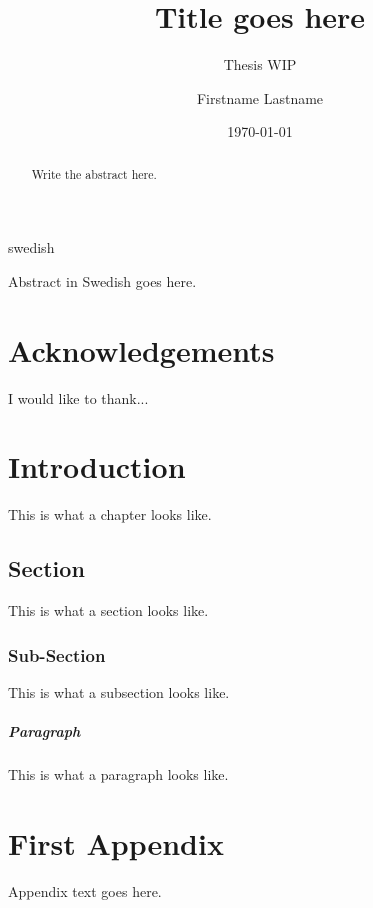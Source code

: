 \documentclass[a4paper,11pt]{kth-mag}
\title{Title goes here}
\subtitle{Thesis WIP}
\author{Firstname Lastname}
\date{\today}
\begin{document}
\frontmatter
\pagestyle{empty}
\removepagenumbers
\maketitle
{}


\clearpage
\begin{abstract}

Write the abstract here.

\end{abstract}
\clearpage
\begin{foreignabstract}{swedish}

Abstract in Swedish goes here.

\end{foreignabstract}
\clearpage

\chapter*{Acknowledgements}

I would like to thank...

\clearpage
\tableofcontents*
\clearpage
\listoffigures*
\clearpage
\listoftables*
\printglossaries
\mainmatter
\pagestyle{newchap}

\chapter{Introduction}
This is what a chapter looks like.

\section{Section}

This is what a section looks like.

\subsection{Sub-Section}
This is what a subsection looks like.

\paragraph{Paragraph} This is what a paragraph looks like.



%
\appendix
\addappheadtotoc
\chapter{First Appendix}

Appendix text goes here.
\end{document}
